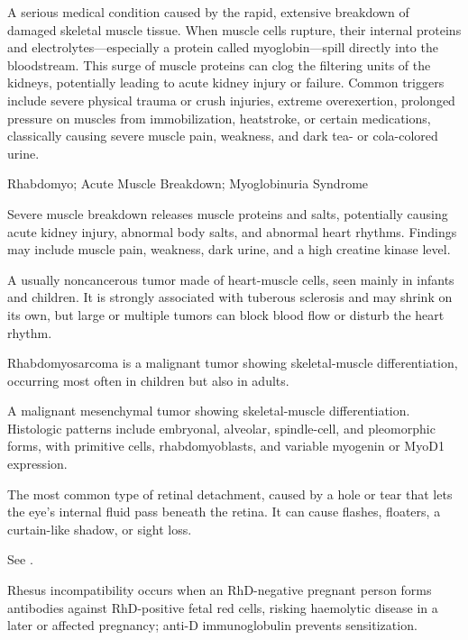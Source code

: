  A serious medical condition caused by the rapid, extensive breakdown of damaged skeletal muscle tissue. When muscle cells rupture, their internal proteins and electrolytes---especially a protein called myoglobin---spill directly into the bloodstream. This surge of muscle proteins can clog the filtering units of the kidneys, potentially leading to acute kidney injury or failure. Common triggers include severe physical trauma or crush injuries, extreme overexertion, prolonged pressure on muscles from immobilization, heatstroke, or certain medications, classically causing severe muscle pain, weakness, and dark tea- or cola-colored urine.

\synonyms
Rhabdomyo; Acute Muscle Breakdown; Myoglobinuria Syndrome

 Severe muscle breakdown releases muscle proteins and salts, potentially causing acute kidney injury, abnormal body salts, and abnormal heart rhythms. Findings may include muscle pain, weakness, dark urine, and a high creatine kinase level.

 A usually noncancerous tumor made of heart-muscle cells, seen mainly in infants and children. It is strongly associated with tuberous sclerosis and may shrink on its own, but large or multiple tumors can block blood flow or disturb the heart rhythm.

 Rhabdomyosarcoma is a malignant tumor showing skeletal-muscle differentiation, occurring most often in children but also in adults.

 A malignant mesenchymal tumor showing skeletal-muscle differentiation. Histologic patterns include embryonal, alveolar, spindle-cell, and pleomorphic forms, with primitive cells, rhabdomyoblasts, and variable myogenin or MyoD1 expression.

 The most common type of retinal detachment, caused by a hole or tear that lets the eye’s internal fluid pass beneath the retina. It can cause flashes, floaters, a curtain-like shadow, or sight loss.

 See .

 Rhesus incompatibility occurs when an RhD-negative pregnant person forms antibodies against RhD-positive fetal red cells, risking haemolytic disease in a later or affected pregnancy; anti-D immunoglobulin prevents sensitization.

